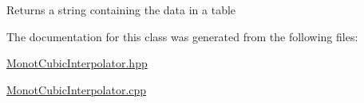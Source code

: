 \begin{DoxyReturn}{Returns}
a string containing the data in a table 
\end{DoxyReturn}


The documentation for this class was generated from the following files\+:\begin{DoxyCompactItemize}
\item 
\hyperlink{_monot_cubic_interpolator_8hpp}{Monot\+Cubic\+Interpolator.\+hpp}\item 
\hyperlink{_monot_cubic_interpolator_8cpp}{Monot\+Cubic\+Interpolator.\+cpp}\end{DoxyCompactItemize}
